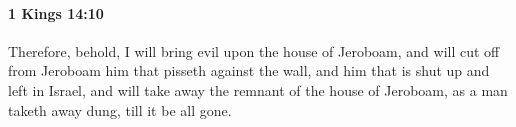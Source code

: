 
		\paragraph{1 Kings 14:10} %
			\label{1KINGS-14-10}

			Therefore, behold, I will bring evil upon the house of Jeroboam, and will cut off from Jeroboam him that pisseth against the wall, and him that is shut up and left in Israel, and will take away the remnant of the house of Jeroboam, as a man taketh away dung, till it be all gone.


